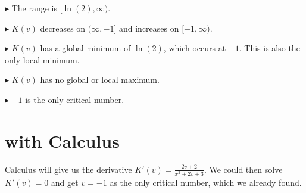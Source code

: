 \documentclass{ximera}
\begin{document}
$\blacktriangleright$  The range is $[\ln(2), \infty)$.

$\blacktriangleright$  $K(v)$ decreases on $(\infty, -1]$ and increases on $[-1, \infty)$.


$\blacktriangleright$  $K(v)$ has a global minimum of $\ln(2)$, which occurs at $-1$.  This is also the only local minimum.

$\blacktriangleright$  $K(v)$ has no global or local maximum.

$\blacktriangleright$  $-1$ is the only critical number.













\section{with Calculus}

Calculus will give us the derivative $K'(v) = \frac{2v+2}{x^2+2v+3}$.  We could then solve $K'(v) = 0$ and get $v=-1$ as the only critical number, which we already found.
\end{document}
